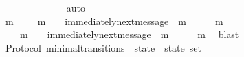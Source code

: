 \begin{isabellebody}
\ {\isacartoucheopen}{\isacharbraceleft}{\isasymsigma}{\isacharcomma}\ {\isasymsigma}{\isacharprime}{\isacharbraceright}\ {\isasymsubseteq}\ {\isasymSigma}\ {\isasymand}\ {\isasymsigma}\ {\isasymsubset}\ {\isasymsigma}{\isacharprime}\ {\isasymand}\ {\isasymsigma}{\isacharprime}\ {\isasymnoteq}\ {\isasymemptyset}{\isacartoucheclose}\ \isamarkupfalse%
\ auto\ \ \ \ \isanewline
\ \ \isamarkupfalse%
\ \isamarkupfalse%
\ {\isachardoublequoteopen}{\isasymsigma}\ {\isasymsubseteq}\ {\isasymsigma}{\isacharprime}{\isacharprime}{\isachardoublequoteclose}\ \ \ \ \isanewline
\ \ \ \ \isamarkupfalse%
\isanewline
\ \ \isamarkupfalse%
\ \isamarkupfalse%
\ {\isachardoublequoteopen}{\isasymexists}{\isasymsigma}{\isacharprime}{\isacharprime}\ m{\isachardot}\ {\isasymsigma}{\isacharprime}{\isacharprime}\ {\isasymin}\ {\isasymSigma}\ {\isasymand}\ m\ {\isasymin}\ {\isasymsigma}{\isacharprime}\ {\isasymand}\ immediately{\isacharunderscore}next{\isacharunderscore}message\ {\isacharparenleft}{\isasymsigma}{\isacharprime}{\isacharprime}{\isacharcomma}\ m{\isacharparenright}\ {\isasymand}\ {\isasymsigma}{\isacharprime}\ {\isacharequal}\ {\isasymsigma}{\isacharprime}{\isacharprime}\ {\isasymunion}\ {\isacharbraceleft}m{\isacharbraceright}\ {\isasymand}\ {\isasymsigma}\ {\isasymsubseteq}\ {\isasymsigma}{\isacharprime}{\isacharprime}{\isachardoublequoteclose}\isanewline
\ \ \ \ \isamarkupfalse%
\ {\isacartoucheopen}{\isasymsigma}{\isacharprime}{\isacharprime}\ {\isasymin}\ {\isasymSigma}\ {\isasymand}\ m\ {\isasymin}\ {\isasymsigma}{\isacharprime}\ {\isasymand}\ immediately{\isacharunderscore}next{\isacharunderscore}message\ {\isacharparenleft}{\isasymsigma}{\isacharprime}{\isacharprime}{\isacharcomma}\ m{\isacharparenright}\ {\isasymand}\ {\isasymsigma}{\isacharprime}\ {\isacharequal}\ {\isasymsigma}{\isacharprime}{\isacharprime}\ {\isasymunion}\ {\isacharbraceleft}m{\isacharbraceright}{\isacartoucheclose}\ \isamarkupfalse%
\ blast\isanewline
{}\isamarkupfalse%
%
\endisatagproof
{\isafoldproof}%
%
\isadelimproof
\isanewline
%
\endisadelimproof
\isanewline
\isanewline
\isanewline
\isanewline
\isanewline
\isanewline
\isanewline
{}\isamarkupfalse%
\ {\isacharparenleft}\ Protocol{\isacharparenright}\ minimal{\isacharunderscore}transitions\ {\isacharcolon}{\isacharcolon}\ {\isachardoublequoteopen}{\isacharparenleft}state\ {\isacharasterisk}\ state{\isacharparenright}\ set{\isachardoublequoteclose}\isanewline

\end{isabellebody}
